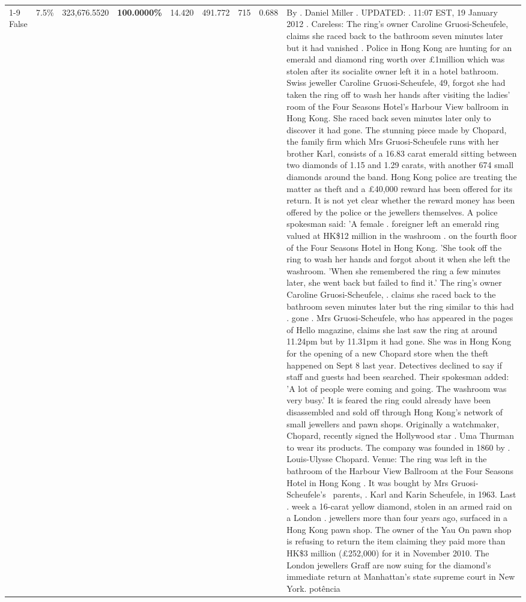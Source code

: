 \begin{table}[H]
\begin{tabular}{lllrlllll}
\cline{1-9}
False & 7.5\% & 323,676.5520 & \bfseries \color{red} 100.0000\% & 14.420 & 491.772 & 715 & 0.688 & By . Daniel Miller . UPDATED: . 11:07 EST, 19 January 2012 . Careless: The ring's owner Caroline Gruosi-Scheufele, claims she raced back to the bathroom seven minutes later but it had vanished . Police in Hong Kong are hunting for an emerald and diamond ring worth over £1million which was stolen after its socialite owner left it in a hotel bathroom. Swiss jeweller Caroline Gruosi-Scheufele, 49, forgot she had taken the ring off to wash her hands after visiting the ladies' room of the Four Seasons Hotel's Harbour View ballroom in Hong Kong. She raced back seven minutes later only to discover it had gone. The stunning piece made by Chopard, the family firm which Mrs Gruosi-Scheufele runs with her brother Karl, consists of a 16.83 carat emerald sitting between two diamonds of 1.15 and 1.29 carats, with another 674 small diamonds around the band. Hong Kong police are treating the matter as theft and a £40,000 reward has been offered for its return. It is not yet clear whether the reward money has been offered by the police or the jewellers themselves. A police spokesman said: 'A female . foreigner left an emerald ring valued at HK\$12 million in the washroom . on the fourth floor of the Four Seasons Hotel in Hong Kong. 'She took off the ring to wash her hands and forgot about it when she left the washroom. 'When she remembered the ring a few minutes later, she went back but failed to find it.' The ring's owner Caroline Gruosi-Scheufele, . claims she raced back to the bathroom seven minutes later but the ring similar to this had . gone . Mrs Gruosi-Scheufele, who has appeared in the pages of Hello magazine, claims she last saw the ring at around 11.24pm but by 11.31pm it had gone. She was in Hong Kong for the opening of a new Chopard store when the theft happened on Sept 8 last year. Detectives declined to say if staff and guests had been searched. Their spokesman added: 'A lot of people were coming and going. The washroom was very busy.' It is feared the ring could already have been disassembled and sold off through Hong Kong's network of small jewellers and pawn shops. Originally a watchmaker, Chopard, recently signed the Hollywood star . Uma Thurman to wear its products. The company was founded in 1860 by . Louis-Ulysse Chopard. Venue: The ring was left in the bathroom of the Harbour View Ballroom at the Four Seasons Hotel in Hong Kong . It was bought by Mrs Gruosi-Scheufele's  parents, . Karl and Karin Scheufele, in 1963. Last . week a 16-carat yellow diamond, stolen in an armed raid on a London . jewellers more than four years ago, surfaced in a Hong Kong pawn shop. The owner of the Yau On pawn shop is refusing to return the item claiming they paid more than HK\$3 million (£252,000) for it in November 2010. The London jewellers Graff are now suing for the diamond’s immediate return at Manhattan’s state supreme court in New York. potência \\

\end{tabular}
\end{table}
